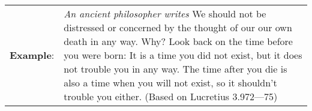 \begin{longtabu} to \textwidth {X[1,c] X[10,l]}
\textbf{Example}: & \textit{An ancient philosopher writes} We should not be distressed or concerned by the thought of our our own death in any way. Why? Look back on the time before you were born: It is a time you did not exist, but it does not trouble you in any way. The time after you die is also a time when you will not exist, so it shouldn't trouble you either. (Based on Lucretius \citet{Lucretius2001} 3.972---75)\\
\end{longtabu}

